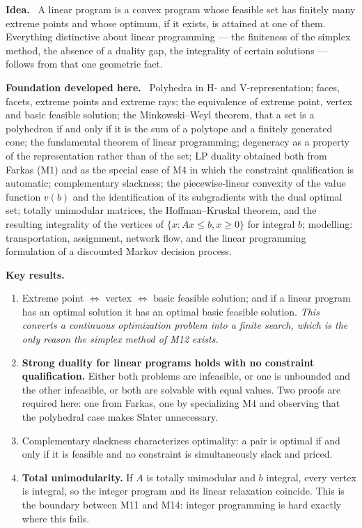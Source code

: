 \documentclass[11pt,a4paper]{article}
\newcommand{\mpart}[1]{\smallskip\noindent\textbf{#1}\ \ignorespaces}
\begin{document}
\mpart{Idea.} A linear program is a convex program whose feasible set has finitely many
extreme points and whose optimum, if it exists, is attained at one of them. Everything
distinctive about linear programming --- the finiteness of the simplex method, the absence of
a duality gap, the integrality of certain solutions --- follows from that one geometric fact.

\mpart{Foundation developed here.} Polyhedra in H- and V-representation; faces, facets,
extreme points and extreme rays; the equivalence of extreme point, vertex and basic feasible
solution; the Minkowski--Weyl theorem, that a set is a polyhedron if and only if it is the sum
of a polytope and a finitely generated cone; the fundamental theorem of linear programming;
degeneracy as a property of the representation rather than of the set; LP duality obtained
both from Farkas (M1) and as the special case of M4 in which the constraint qualification is
automatic; complementary slackness; the piecewise-linear convexity of the value function
$v(b)$ and the identification of its subgradients with the dual optimal set; totally
unimodular matrices, the Hoffman--Kruskal theorem, and the resulting integrality of the
vertices of $\{x: Ax\le b, x\ge0\}$ for integral $b$; modelling: transportation, assignment,
network flow, and the linear programming formulation of a discounted Markov decision process.

\mpart{Key results.}
\begin{enumerate}
\item Extreme point $\iff$ vertex $\iff$ basic feasible solution; and if a linear program has
an optimal solution it has an optimal basic feasible solution. \emph{This converts a
continuous optimization problem into a finite search, which is the only reason the simplex
method of M12 exists.}
\item \textbf{Strong duality for linear programs holds with no constraint qualification.}
Either both problems are infeasible, or one is unbounded and the other infeasible, or both are
solvable with equal values. Two proofs are required here: one from Farkas, one by specializing
M4 and observing that the polyhedral case makes Slater unnecessary.
\item Complementary slackness characterizes optimality: a pair is optimal if and only if it is
feasible and no constraint is simultaneously slack and priced.
\item \textbf{Total unimodularity.} If $A$ is totally unimodular and $b$ integral, every vertex
is integral, so the integer program and its linear relaxation coincide. This is the boundary
between M11 and M14: integer programming is hard exactly where this fails.
\end{enumerate}
\end{document}
